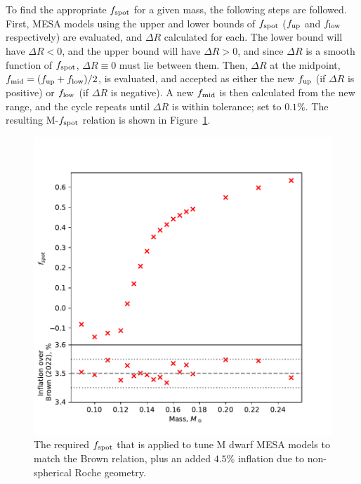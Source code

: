 To find the appropriate $f_{\rm spot}$ for a given mass, the following steps are followed.
First, MESA models using the upper and lower bounds of $f_{\rm spot}$ ($f_{\rm up}$ and $f_{\rm low}$ respectively) are evaluated, and $\Delta R$ calculated for each.
The lower bound will have $\Delta R < 0$, and the upper bound will have $\Delta R > 0$, and since $\Delta R$ is a smooth function of $f_{\rm spot}$, $\Delta R \equiv 0$ must lie between them.
Then, $\Delta R$ at the midpoint, $f_{\rm mid} = (f_{\rm up} + f_{\rm low})/2$, is evaluated, and accepted as either the new $f_{\rm up}$ (if $\Delta R$ is positive) or $f_{\rm low}$ (if $\Delta R$ is negative).
A new $f_{\rm mid}$ is then calculated from the new range, and the cycle repeats until $\Delta R$ is within tolerance; set to $0.1\%$.
The resulting M-$f_{\rm spot}$ relation is shown in Figure~\ref{fig:modelling:fspot mass relationship}.
\begin{figure}
    \centering
    \includegraphics[width=\textwidth]{figures/modelling/fspot_relation_to_match_brown_plus_3.5.pdf}
    \caption{The required $f_{\rm spot}$ that is applied to tune M dwarf MESA models to match the Brown relation, plus an added $4.5\%$ inflation due to non-spherical Roche geometry.}
    \label{fig:modelling:fspot mass relationship}
\end{figure}

